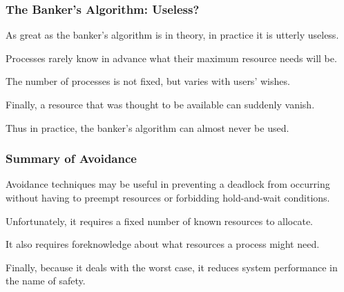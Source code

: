 \begin{frame}
	\frametitle{The Banker's Algorithm: Useless?}

	As great as the banker's algorithm is in theory, in practice it is utterly useless.

	Processes rarely know in advance what their maximum resource needs will be.

	The number of processes is not fixed, but varies with users' wishes.

	Finally, a resource that was thought to be available can suddenly vanish.

	Thus in practice, the banker's algorithm can almost never be used.


\end{frame}

\begin{frame}
	\frametitle{Summary of Avoidance}

	Avoidance techniques may be useful in preventing a deadlock from occurring without having to preempt resources or forbidding hold-and-wait conditions.

	Unfortunately, it requires a fixed number of known resources to allocate.

	It also requires foreknowledge about what resources a process might need.

	Finally, because it deals with the worst case, it reduces system performance in the name of safety.

\end{frame}




